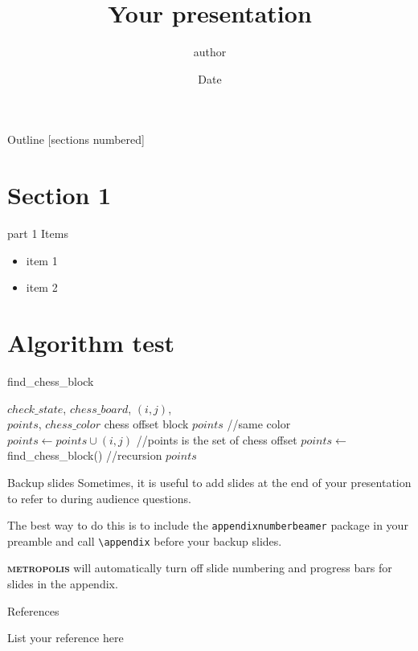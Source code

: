 \documentclass[10pt]{beamer}
\title{Your presentation}
\date{Date} %
\author{author}
\institute{Institute, department}
\newcommand{\themename}{\textbf{\textsc{metropolis}}\xspace}
\begin{document}
\maketitle

\begin{frame}{Outline}
  [sections numbered]
  \tableofcontents[hideallsubsections]
\end{frame}

\section{Section 1}
\begin{frame}[fragile]{part 1}
  Items
  \begin{itemize}
    \item item 1
    \item item 2
  \end{itemize}
\end{frame}


\section{Algorithm test}
\begin{frame}[fragile]
\begin{algorithm}[H]
\caption{find\_chess\_block}  
\begin{algorithmic}[1]
  \REQUIRE $check\_state$, $chess\_board$, $(i,j)$,\\$points$, $chess\_color$
  \ENSURE  chess offset block $points$ //same color
  \STATE $points \gets points \cup (i,j)$ //points is the set of chess offset
        \STATE $points \gets$ {find\_chess\_block(\;)} //recursion
      \ENDIF
    \ENDFOR
 \RETURN $points$ 
 \end{algorithmic} 
 \end{algorithm}
\end{frame}



\appendix

\begin{frame}[fragile]{Backup slides}
  Sometimes, it is useful to add slides at the end of your presentation to
  refer to during audience questions.

  The best way to do this is to include the \verb|appendixnumberbeamer|
  package in your preamble and call \verb|\appendix| before your backup slides.

  \themename will automatically turn off slide numbering and progress bars for
  slides in the appendix.
\end{frame}

\begin{frame}[allowframebreaks]{References}

  
  
  List your reference here
\end{frame}
\end{document}
